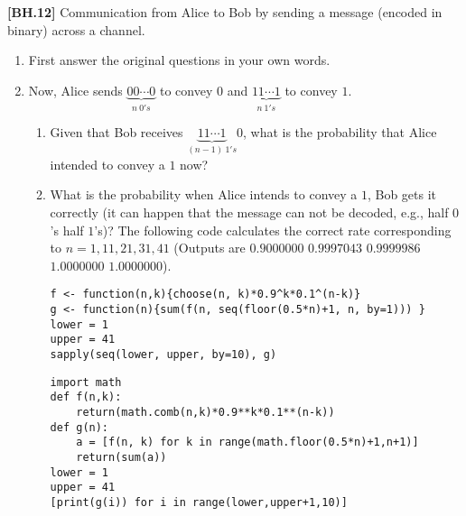 \begin{exercise}
	\textbf{[BH.12]} Communication from Alice to Bob by sending a message (encoded in binary) across a channel.  
	\begin{enumerate}
		\item First answer the original questions in your own words.
		\item Now, Alice sends $\underbrace{00\cdots0}_{n \  0's}$ to convey $0$ and $\underbrace{11\cdots1}_{n \  1's}$ to convey $1$. 
		\begin{enumerate}
			\item Given that Bob receives $\underbrace{11\cdots1}_{(n-1) \ 1's}0$, what is the probability that Alice intended to convey a $1$ now? 
			\item What is the probability when Alice intends to convey a $1$, Bob gets it correctly (it can happen that the message can not be decoded, e.g., half $0$'s half $1$'s)? The following code calculates the correct rate corresponding to $n=1,11,21,31,41$  (Outputs are $0.9000000$ $0.9997043$ $0.9999986$ $1.0000000$ $1.0000000$).
			\begin{verbatim}
f <- function(n,k){choose(n, k)*0.9^k*0.1^(n-k)}
g <- function(n){sum(f(n, seq(floor(0.5*n)+1, n, by=1))) } 
lower = 1
upper = 41
sapply(seq(lower, upper, by=10), g)
			\end{verbatim}
\begin{verbatim}
import math
def f(n,k):
    return(math.comb(n,k)*0.9**k*0.1**(n-k))
def g(n):
    a = [f(n, k) for k in range(math.floor(0.5*n)+1,n+1)]
    return(sum(a))
lower = 1
upper = 41
[print(g(i)) for i in range(lower,upper+1,10)]        
			\end{verbatim}			
		\end{enumerate}
		
	\end{enumerate}  
\end{exercise}
